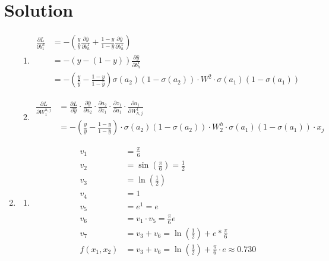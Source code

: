 \documentclass[submit]{harvardml}
\newenvironment{answer}
  {\section*{Solution}}
{}
\begin{document}
\begin{answer}
\begin{enumerate}
\begin{enumerate}
            \item
                  \begin{align*}
                    \frac {\partial L}{\partial b_1^h} & = -\left( \frac{y}{\hat{y}} \frac{\partial \hat{y}}{\partial b^{1}_{h}} + \frac{1-y}{1-\hat{y}} \frac{\partial \hat{y}}{\partial b^{1}_{h}} \right) \\
&= -\left( y - (1-y) \right) \frac{\partial \hat{y}}{\partial b^{1}_{h}} \\
&= -\left( \frac{y}{\hat{y}} - \frac{1 - y}{1 - \hat{y}} \right) \sigma(a_2) (1 - \sigma(a_2)) \cdot W^{2} \cdot \sigma(a_1) (1 - \sigma(a_1))
                  \end{align*}

            \item
                  \begin{align*}
                    \frac {\partial L}{\partial W_1^{h,j}} & = \frac{\partial L}{\partial \hat{y}} \cdot \frac{\partial \hat{y}}{\partial a_2} \cdot \frac{\partial a_2}{\partial z_1} \cdot \frac{\partial z_1}{\partial a_1} \cdot \frac{\partial a_1}{\partial W^{1}_{h,j}} \\
&= -\left( \frac{y}{\hat{y}} - \frac{1 - y}{1 - \hat{y}} \right) \cdot \sigma(a_2) (1 - \sigma(a_2)) \cdot W_2^h \cdot \sigma(a_1)(1 - \sigma(a_1)) \cdot x_j
                  \end{align*}
          \end{enumerate}

    \item

          \begin{enumerate}
            \item
                  \begin{align*}
                   v_1 &= \frac{\pi}{6} \\
v_2 &= \sin\left(\frac{\pi}{6}\right) = \frac{1}{2} \\
v_3 &= \ln\left(\frac{1}{2}\right) \\
v_4 &= 1 \\
v_5 &= e^{1} = e \\
v_6 &= v_1 \cdot v_5 = \frac{\pi}{6} e \\
v_7 &= v_3 + v_6 = \ln\left(\frac{1}{2}\right) + e*\frac{\pi}{6} \\
f(x_1, x_2) & = v_3 + v_6 = \ln\left(\frac{1}{2}\right) + \frac{\pi}{6} \cdot e \approx 0.730 \\
                  \end{align*}


\end{enumerate}
\end{enumerate}
\end{answer}
\end{document}
